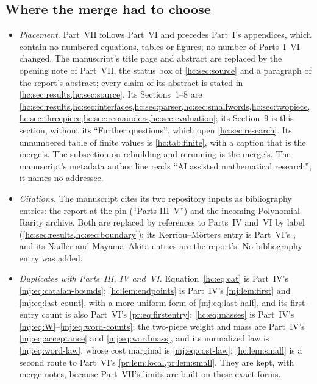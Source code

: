 \documentclass[11pt,a4paper]{article}
\theoremstyle{definition}\newaliascnt{definition}{theorem}
\theoremstyle{remark}\newaliascnt{remark}{theorem}
\begin{document}
\subsection{Where the merge had to choose}
\label{hc:sec:merge}
\begin{itemize}
\item \emph{Placement.} Part~VII follows Part~VI and precedes Part~I's
 appendices, which contain no numbered equations, tables or figures; no
 number of Parts~I--VI changed. The manuscript's title page and abstract
 are replaced by the opening note of Part~VII, the status box of
 \cref{hc:sec:source} and a paragraph of the report's abstract; every claim
 of its abstract is stated in \cref{hc:sec:results,hc:sec:source}. Its
 Sections~1--8 are \cref{hc:sec:results,hc:sec:interfaces,hc:sec:parser,hc:sec:smallwords,hc:sec:twopiece,hc:sec:threepiece,hc:sec:remainders,hc:sec:evaluation};
 its Section~9 is this section, without its ``Further questions'', which
 open \cref{hc:sec:research}. Its unnumbered table of finite values is
 \cref{hc:tab:finite}, with a caption that is the merge's. The subsection
 on rebuilding and rerunning is the merge's. The manuscript's metadata
 author line reads ``AI assisted mathematical research''; it names no
 addressee.
\item \emph{Citations.} The manuscript cites its two repository inputs as
 bibliography entries: the report at the pin (``Parts III--V'') and the
 incoming Polynomial Rarity archive. Both are replaced by references to
 Parts~IV and~VI by label (\cref{hc:sec:results,hc:sec:boundary}); its
 Kerriou--M\"orters entry is Part~VI's \cite{pr:KerriouMorters}, and its
 Nadler and Mayama--Akita entries are the report's. No bibliography entry
 was added.
\item \emph{Duplicates with Parts~III, IV and~VI.} Equation~\eqref{hc:eq:cat} is
 Part~IV's \eqref{mj:eq:catalan-bounds}; \cref{hc:lem:endpoints} is Part~IV's
 \cref{mj:lem:first} and \eqref{mj:eq:last-count}, with a more uniform form
 of \eqref{mj:eq:last-half}, and its first-entry count is also Part~VI's
 \eqref{pr:eq:firstentry}; \eqref{hc:eq:masses} is Part~IV's
 \eqref{mj:eq:W}--\eqref{mj:eq:word-counts}; the two-piece weight and mass
 are Part~IV's \eqref{mj:eq:acceptance} and \eqref{mj:eq:wordmass}, and its
 normalized law is \eqref{mj:eq:word-law}, whose cost marginal is
 \eqref{mj:eq:cost-law}; \cref{hc:lem:small} is a second route to Part~VI's
 \cref{pr:lem:local,pr:lem:small}. They are kept, with merge notes, because
 Part~VII's limits are built on these exact forms. 

\end{itemize}
\end{document}
